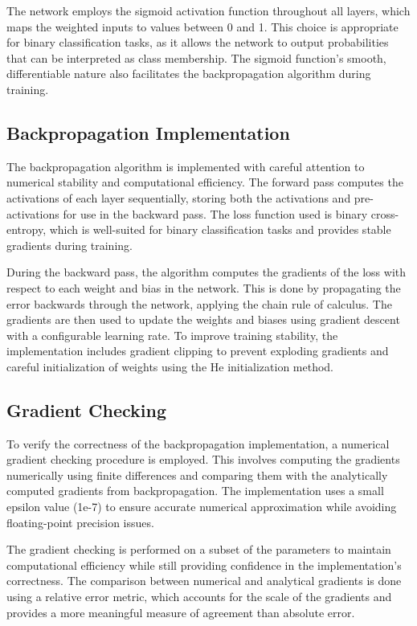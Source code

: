 \documentclass[11pt,a4paper]{article}
\begin{document}
The network employs the sigmoid activation function throughout all layers, which maps the weighted inputs to values between 0 and 1. This choice is appropriate for binary classification tasks, as it allows the network to output probabilities that can be interpreted as class membership. The sigmoid function's smooth, differentiable nature also facilitates the backpropagation algorithm during training.

\subsection{Backpropagation Implementation}
The backpropagation algorithm is implemented with careful attention to numerical stability and computational efficiency. The forward pass computes the activations of each layer sequentially, storing both the activations and pre-activations for use in the backward pass. The loss function used is binary cross-entropy, which is well-suited for binary classification tasks and provides stable gradients during training.

During the backward pass, the algorithm computes the gradients of the loss with respect to each weight and bias in the network. This is done by propagating the error backwards through the network, applying the chain rule of calculus. The gradients are then used to update the weights and biases using gradient descent with a configurable learning rate. To improve training stability, the implementation includes gradient clipping to prevent exploding gradients and careful initialization of weights using the He initialization method.

\subsection{Gradient Checking}
To verify the correctness of the backpropagation implementation, a numerical gradient checking procedure is employed. This involves computing the gradients numerically using finite differences and comparing them with the analytically computed gradients from backpropagation. The implementation uses a small epsilon value (1e-7) to ensure accurate numerical approximation while avoiding floating-point precision issues.

The gradient checking is performed on a subset of the parameters to maintain computational efficiency while still providing confidence in the implementation's correctness. The comparison between numerical and analytical gradients is done using a relative error metric, which accounts for the scale of the gradients and provides a more meaningful measure of agreement than absolute error.
\end{document}
